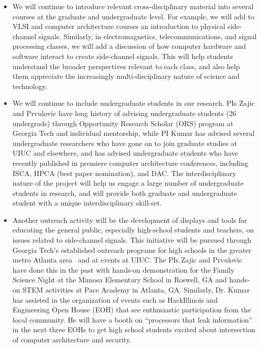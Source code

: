 \documentclass[11 pt]{article}
\begin{document}
\begin{itemize}[topsep=0pt,itemsep=0pt]

\item We will continue to introduce relevant cross-disciplinary material into several courses at the graduate and undergraduate level.
For example, we will add to VLSI and computer architecture courses an introduction to physical side-channel signals.
Similarly, in electromagnetics, telecommunications, and signal processing classes, we will add a discussion of how computer
hardware and software interact to create side-channel signals. This will help students understand the broader perspectives relevant to
each class, and also help them appreciate the increasingly multi-disciplinary nature of science and technology.

\item We will continue to include undergraduate students in our research.
PIs Zajic and Prvulovic have long history of advising undergraduate students (26 undergrads)
through Opportunity Research Scholar (ORS) program at Georgia Tech and individual mentorship,
while PI Kumar has advised several undergraduate researchers who have gone on to join graduate
studies at UIUC and elsewhere, and has advised undergraduate students who have recently published
in premiere computer architecture conferences, including ISCA, HPCA (best paper nomination),
and DAC. The interdisciplinary nature of the project will help us engage a large number of undergraduate
students in research, and will provide both graduate and undergraduate student with a unique interdisciplinary skill-set.

\item Another outreach activity will be the development of displays
  and tools for educating the general public, especially high-school
  students and teachers, on issues related to side-channel signals.
  This initiative will be pursued through Georgia Tech’s established
  outreach programs for high schools in the greater metro Atlanta
  area~\cite{Conrad2022} and at events at UIUC.
  The PIs Zajic and Prvulovic have done this in the past with hands-on
  demonstration for the Family Science Night at the Mimosa Elementary
  School in Roswell, GA and hands-on STEM activities at Pace Academy
  in Atlanta, GA.
Similarly, Dr. Kumar has assisted in the organization of events such as
HackIllinois and Engineering Open House (EOH) that see enthusiastic
participation from the local community.
He will have a booth on ``processors that leak information'' in the next three EOHs to get high school students excited about intersection of computer architecture and security.
\end{itemize}
\end{document}
